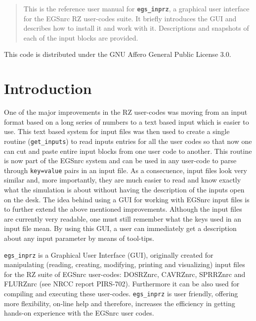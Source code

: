 \documentclass[12pt,twoside]{article}   %
\begin{document}


\pagestyle{empty}

\pagestyle{fancy}



\newpage
\begin{abstract}

This is the reference user manual for {\bf \tt egs\_inprz}, a graphical user interface
for the EGSnrc RZ user-codes suite. It briefly introduces the GUI and describes how
to install it and work with it. Descriptions and snapshots of each of the input blocks
are provided.

\end{abstract}



\noindent
This code is distributed under the GNU Affero General Public License 3.0.


\tableofcontents


\newpage

\section{Introduction}

One of the major improvements in the RZ user-codes was moving from an input format
based on a long series of numbers to a text based input which is easier to use.
This text based system for input files was then used to create a single routine
({\tt get\_inputs}) to read inputs entries for all the user codes so that now
one can cut and paste entire input blocks from one user code to another.
This routine is now part of the EGSnrc system and can be used in any user-code to
parse through {\tt key=value} pairs in an input file.
As a consecuence, input files look very similar and,
more importantly, they are much easier to read and know exactly what the simulation
is about without having the description of the inputs open on the desk.
The idea behind using a GUI for working with EGSnrc input files is to further
extend the above mentioned improvements. Although the input files are currently
very readable, one must still remember what the keys used in an input file mean.
By using this GUI, a user can immediately get a description about any input parameter
by means of tool-tips.

{\tt egs\_inprz} is a Graphical User Interface (GUI), originally created for manipulating
(reading, creating, modifying, printing and visualizing)
input files for the  RZ suite of EGSnrc  user-codes:
DOSRZnrc, CAVRZnrc, SPRRZnrc and FLURZnrc (see NRCC report PIRS-702\cite{Ro10}).
Furthermore it can be also used for compiling and executing these user-codes.
 {\tt egs\_inprz} is user friendly, offering more flexibility, on-line help and therefore,
increases the efficiency in getting hands-on experience with the EGSnrc user codes.
\end{document}
